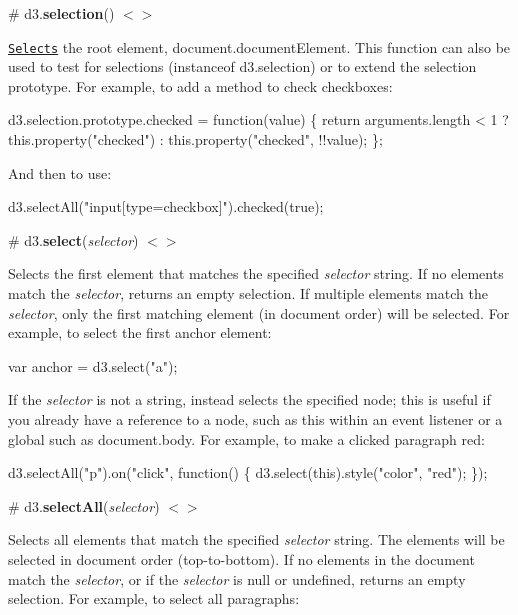 \label{_selection}%
\# d3.{\bfseries selection}() \href{https://github.com/d3/d3-selection/blob/master/src/selection/index.js#L38}{\tt $<$$>$}

\href{#select}{\tt Selects} the root element, {\ttfamily document.\+document\+Element}. This function can also be used to test for selections ({\ttfamily instanceof d3.\+selection}) or to extend the selection prototype. For example, to add a method to check checkboxes\+:


\begin{DoxyCode}
d3.selection.prototype.checked = function(value) \{
  return arguments.length < 1
      ? this.property("checked")
      : this.property("checked", !!value);
\};
\end{DoxyCode}


And then to use\+:


\begin{DoxyCode}
d3.selectAll("input[type=checkbox]").checked(true);
\end{DoxyCode}


\label{_select}%
\# d3.{\bfseries select}({\itshape selector}) \href{https://github.com/d3/d3-selection/blob/master/src/select.js#L3}{\tt $<$$>$}

Selects the first element that matches the specified {\itshape selector} string. If no elements match the {\itshape selector}, returns an empty selection. If multiple elements match the {\itshape selector}, only the first matching element (in document order) will be selected. For example, to select the first anchor element\+:


\begin{DoxyCode}
var anchor = d3.select("a");
\end{DoxyCode}


If the {\itshape selector} is not a string, instead selects the specified node; this is useful if you already have a reference to a node, such as {\ttfamily this} within an event listener or a global such as {\ttfamily document.\+body}. For example, to make a clicked paragraph red\+:


\begin{DoxyCode}
d3.selectAll("p").on("click", function() \{
  d3.select(this).style("color", "red");
\});
\end{DoxyCode}


\label{_selectAll}%
\# d3.{\bfseries select\+All}({\itshape selector}) \href{https://github.com/d3/d3-selection/blob/master/src/selectAll.js#L3}{\tt $<$$>$}

Selects all elements that match the specified {\itshape selector} string. The elements will be selected in document order (top-\/to-\/bottom). If no elements in the document match the {\itshape selector}, or if the {\itshape selector} is null or undefined, returns an empty selection. For example, to select all paragraphs\+:


